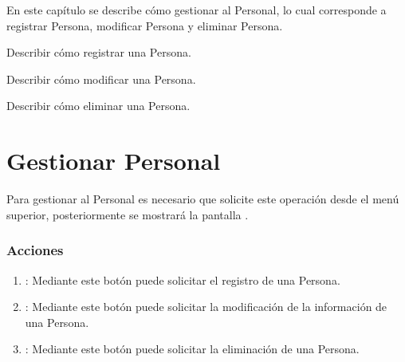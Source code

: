 
En este capítulo se describe cómo gestionar al Personal, lo cual corresponde a registrar Persona, modificar Persona y eliminar Persona.\\


\begin{objetivos}
	\item Describir cómo registrar una Persona.
	\item Describir cómo modificar una Persona.
	\item Describir cómo eliminar una Persona.
\end{objetivos}

\section{Gestionar Personal}

Para gestionar al Personal es necesario que solicite este operación desde el menú superior, posteriormente se mostrará la pantalla . 


\subsubsection{Acciones}

\begin{enumerate}
	\item {}: Mediante este botón puede solicitar el registro de una Persona.
	\item {}: Mediante este botón puede solicitar la modificación de la información de una Persona.
	\item {}: Mediante este botón puede solicitar la eliminación de una Persona.
\end{enumerate}





